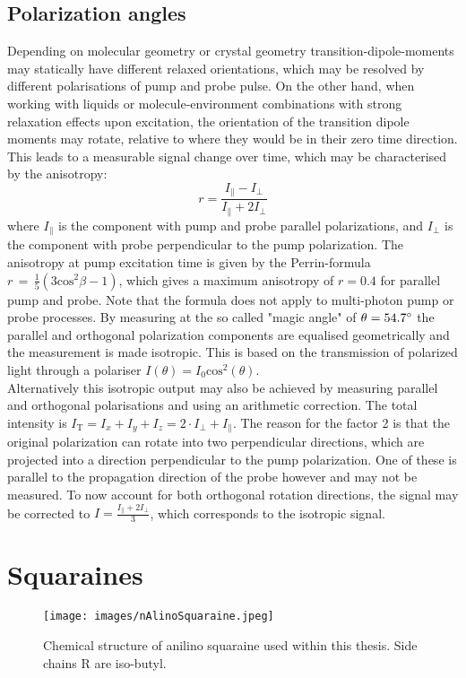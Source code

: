 \documentclass[twoside,openright,listof=numbered]{scrreprt}
\begin{document}
\subsection{Polarization angles}\label{sec:PolAngles}
Depending on molecular geometry or crystal geometry transition-dipole-moments may statically have different relaxed orientations, which may be resolved by different polarisations of pump and probe pulse. On the other hand, when working with liquids or molecule-environment combinations with strong relaxation effects upon excitation, the orientation of the transition dipole moments may rotate, relative to where they would be in their zero time direction. This leads to a measurable signal change over time, which may be characterised by the anisotropy:\cite[chapter 10]{Lakowicz2008}
\begin{equation*}
r = \frac{I_{\parallel}-I_{\perp}}{I_{\parallel}+2I_{\perp}}
\end{equation*}
where $I_\parallel$ is the component with pump and probe parallel polarizations, and $I_\perp$ is the component with probe perpendicular to the pump polarization. The anisotropy at pump excitation time is given by the Perrin-formula $r\, =\, \frac{1}{5}\left(3\mathrm{cos^2}\beta-1\right)$, which gives a maximum anisotropy of $r=0.4$ for parallel pump and probe. Note that the formula does not apply to multi-photon pump or probe processes.  By measuring at the so called "magic angle" of $\theta = 54.7 \degree$ the parallel and orthogonal polarization components are equalised geometrically and the measurement is made isotropic. This is based on the transmission of polarized light through a polariser $I(\theta) = I_0 \mathrm{cos}^2(\theta)$. \cite[chapter 10]{Lakowicz2008}\cite{Schalk2010}\\
Alternatively this isotropic output may also be achieved by measuring parallel and orthogonal polarisations and using an arithmetic correction. The total intensity is $I_\text{T} = I_x+I_y+I_z = 2\cdot I_\perp + I_\parallel$. The reason for the factor 2 is that the original polarization can rotate into two perpendicular directions, which are projected into a direction perpendicular to the pump polarization. One of these is parallel to the propagation direction of the probe however and may not be measured. To now account for both orthogonal rotation directions, the signal may be corrected to $I = \frac{I_\parallel + 2I_\perp}{3}$, which corresponds to the isotropic signal.\cite{Zheng2020}



\section{Squaraines}
\begin{figure}[hbtp]
\centering
\texttt{[image: images/nAlinoSquaraine.jpeg]}
\caption[Chemical structure of anilino squaraine.]{Chemical structure of anilino squaraine used within this thesis. Side chains R are iso-butyl.\label{fig:chemStructureSQIB}}
\end{figure}
\end{document}
